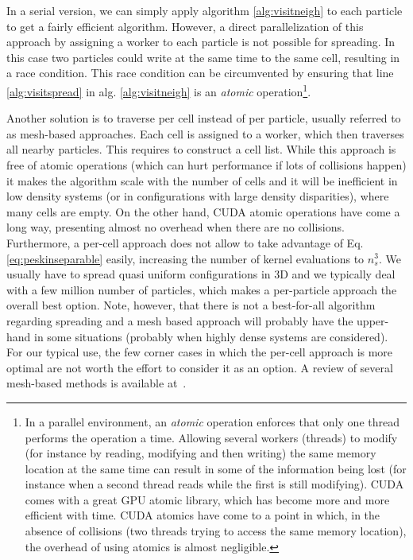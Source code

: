 \documentclass[ twoside,openright,titlepage,numbers=noenddot,%
headinclude,footinclude,cleardoublepage=empty,abstract=on,
BCOR=5mm,paper=b5,fontsize=11pt, dvipsnames
]{scrreprt}
\begin{document}
In a serial version, we can simply apply algorithm \ref{alg:visitneigh} to each particle to get a fairly efficient algorithm. However, a direct parallelization of this approach by assigning a worker to each particle is not possible for spreading. In this case two particles could write at the same time to the same cell, resulting in a race condition. This race condition can be circumvented by ensuring that line \ref{alg:visitspread} in alg. \ref{alg:visitneigh} is an \emph{atomic} operation\footnote{In a parallel environment, an \emph{atomic} operation enforces that only one thread performs the operation a time. Allowing several workers (threads) to modify (for instance by reading, modifying and then writing) the same memory location at the same time can result in some of the information being lost (for instance when a second thread reads while the first is still modifying). CUDA comes with a great GPU atomic library, which has become more and more efficient with time. CUDA atomics have come to a point in which, in the absence of collisions (two threads trying to access the same memory location), the overhead of using atomics is almost negligible.}.

Another solution is to traverse per cell instead of per particle, usually referred to as mesh-based approaches. Each cell is assigned to a worker, which then traverses all nearby particles. This requires to construct a cell list. While this approach is free of atomic operations (which can hurt performance if lots of collisions happen) it makes the algorithm scale with the number of cells and it will be inefficient in low density systems (or in configurations with large density disparities), where many cells are empty. On the other hand, CUDA atomic operations have come a long way, presenting almost no overhead when there are no collisions. Furthermore, a per-cell approach does not allow to take advantage of Eq. \eqref{eq:peskinseparable} easily, increasing the number of kernel evaluations to $n_s^3$.
We usually have to spread quasi uniform configurations in 3D and we typically deal with a few million number of particles, which makes a per-particle approach the overall best option. Note, however, that there is not a best-for-all algorithm regarding spreading and a mesh based approach will probably have the upper-hand in some situations (probably when highly dense systems are considered).
For our typical use, the few corner cases in which the per-cell approach is more optimal are not worth the effort to consider it as an option. A review of several mesh-based methods is available at~\cite{Guo2015}.
\end{document}
